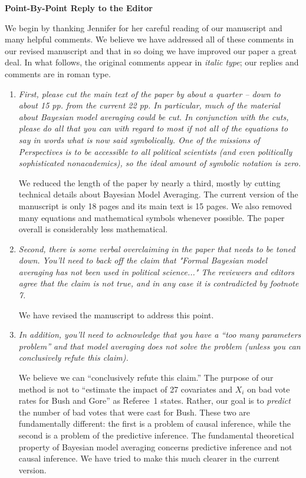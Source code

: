 \documentclass[11pt]{article}
\begin{document}
\begin{center}
  {\bf \Large Point-By-Point Reply to the Editor}
\end{center}

We begin by thanking Jennifer for her careful reading of our
manuscript and many helpful comments. We believe we have addressed all
of these comments in our revised manuscript and that in so doing we
have improved our paper a great deal.  In what follows, the original
comments appear in \emph{italic type}; our replies and comments are in
roman type.


\begin{enumerate}
\item {\it First, please cut the main text of the paper by about a
    quarter -- down to about 15 pp. from the current 22 pp.  In
    particular, much of the material about Bayesian model averaging
    could be cut. In conjunction with the cuts, please do all that you
    can with regard to most if not all of the equations to say in
    words what is now said symbolically. One of the missions of
    Perspectives is to be accessible to all political scientists (and
    even politically sophisticated nonacademics), so the ideal amount
    of symbolic notation is zero.}
  
  We reduced the length of the paper by nearly a third, mostly by
  cutting technical details about Bayesian Model Averaging.  The
  current version of the manuscript is only 18 pages and its main text
  is 15 pages.  We also removed many equations and mathematical
  symbols whenever possible.  The paper overall is considerably less
  mathematical.
  
\item {\it Second, there is some verbal overclaiming in the paper that
    needs to be toned down.  You'll need to back off the claim that
    "Formal Bayesian model averaging has not been used in political
    science..."  The reviewers and editors agree that the claim is not
    true, and in any case it is contradicted by footnote 7.}
  
  We have revised the manuscript to address this point.
  
\item {\it In addition, you'll need to acknowledge that you have a
    ``too many parameters problem'' and that model averaging does not
    solve the problem (unless you can conclusively refute this
    claim).}
  
  We believe we can ``conclusively refute this claim.''  The purpose
  of our method is not to ``estimate the impact of 27 covariates and
  $X_i$ on bad vote rates for Bush and Gore'' as Referee~1 states.
  Rather, our goal is to \emph{predict} the number of bad votes that
  were cast for Bush. These two are fundamentally different: the first
  is a problem of causal inference, while the second is a problem of
  the predictive inference. The fundamental theoretical property of
  Bayesian model averaging concerns predictive inference and not
  causal inference.  We have tried to make this much clearer in the
  current version.
  

\end{enumerate}
\end{document}
